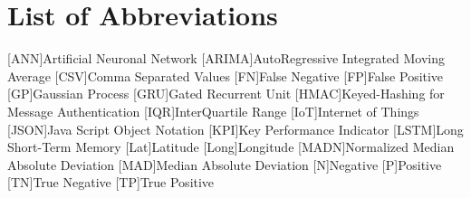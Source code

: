 \newpage





\newpage
\listoffigures


\newpage
\listoftables
\clearpage

\renewcommand\listoflistingscaption{List of source codes}
\listoflistings
\clearpage


{}
\chapter*{List of Abbreviations}
\begin{acronym}%
	[ANN]{Artificial Neuronal Network}
	[ARIMA]{AutoRegressive Integrated Moving Average}
	[CSV]{Comma Separated Values }
	[FN]{False Negative}
	[FP]{False Positive}
	[GP]{Gaussian Process}
	[GRU]{Gated Recurrent Unit}
	[HMAC]{Keyed-Hashing for Message Authentication}
	[IQR]{InterQuartile Range}
	[IoT]{Internet of Things}
	[JSON]{Java Script Object Notation}
	[KPI]{Key Performance Indicator}
	[LSTM]{Long Short-Term Memory}
	[Lat]{Latitude}
	[Long]{Longitude}
	[MADN]{Normalized Median Absolute Deviation}
	[MAD]{Median Absolute Deviation}
	{Negative}
	{Positive}
	[TN]{True Negative}
	[TP]{True Positive}
\end{acronym}

